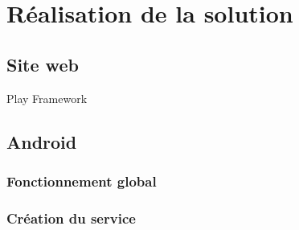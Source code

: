 \cleardoublepage



\chapter{Réalisation de la solution}


\section{Site web}

Play Framework
\\






\section{Android}



\subsection{Fonctionnement global}
\subsection{Création du service}
